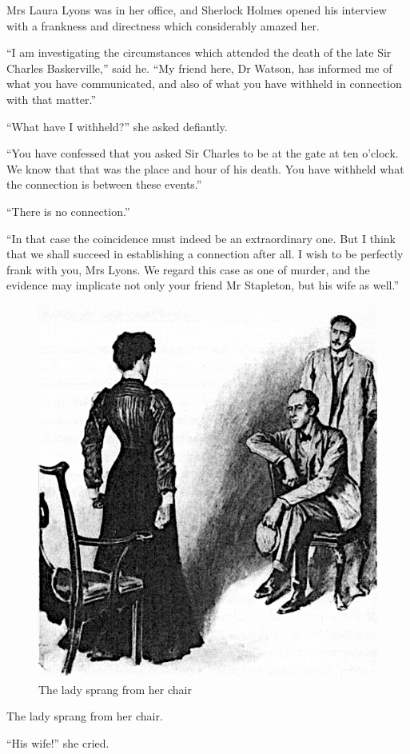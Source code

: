 \documentclass[paper=5.5in:8.5in,BCOR=7mm,twoside,DIV=calc,12pt,usegeometry,openany,chapterprefix,endperiod]{scrbook} %
\begin{document}
Mrs Laura Lyons was in her office, and Sherlock Holmes opened his interview with a frankness and directness which considerably amazed her.

\enquote{I am investigating the circumstances which attended the death of the late Sir Charles Baskerville,} said he. \enquote{My friend here, Dr Watson, has informed me of what you have communicated, and also of what you have withheld in connection with that matter.}

\enquote{What have I withheld?} she asked defiantly.

\enquote{You have confessed that you asked Sir Charles to be at the gate at ten o'clock. We know that that was the place and hour of his death. You have withheld what the connection is between these events.}

\enquote{There is no connection.}

\enquote{In that case the coincidence must indeed be an extraordinary one. But I think that we shall succeed in establishing a connection after all. I wish to be perfectly frank with you, Mrs Lyons. We regard this case as one of murder, and the evidence may implicate not only your friend Mr Stapleton, but his wife as well.}

\begin{figure}[tbh]
\centering
\includegraphics[width=.7\linewidth]{13_sprang}
\caption{The lady sprang from her chair}
\end{figure}

The lady sprang from her chair.

\enquote{His wife!} she cried.
\end{document}
